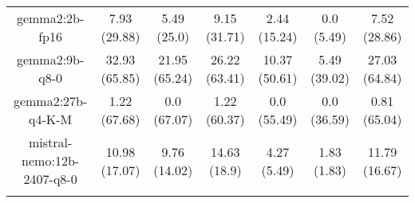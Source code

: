 \begin{table}[]
{\begin{tabular}{ccccccc}
        \multicolumn{1}{c|}{gemma2:2b-fp16} & 7.93 (29.88) & 5.49 (25.0) & \multicolumn{1}{c|}{9.15 (31.71)} & 2.44 (15.24) & \multicolumn{1}{c|}{0.0 (5.49)} & 7.52 (28.86) \\
        

        \multicolumn{1}{c|}{gemma2:9b-q8-0} & 32.93 (65.85) & 21.95 (65.24) & \multicolumn{1}{c|}{26.22 (63.41)} & 10.37 (50.61) & \multicolumn{1}{c|}{5.49 (39.02)} & 27.03 (64.84) \\
        

        \multicolumn{1}{c|}{gemma2:27b-q4-K-M} & 1.22 (67.68) & 0.0 (67.07) & \multicolumn{1}{c|}{1.22 (60.37)} & 0.0 (55.49) & \multicolumn{1}{c|}{0.0 (36.59)} & 0.81 (65.04) \\
        

        \multicolumn{1}{c|}{mistral-nemo:12b-2407-q8-0} & 10.98 (17.07) & 9.76 (14.02) & \multicolumn{1}{c|}{14.63 (18.9)} & 4.27 (5.49) & \multicolumn{1}{c|}{1.83 (1.83)} & 11.79 (16.67) \\
        
\\ \hline
\end{tabular}%
}
\end{table}
    